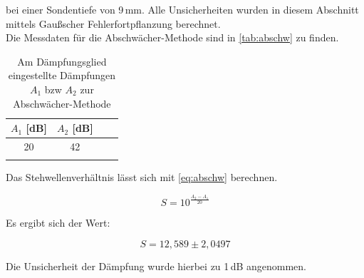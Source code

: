 bei einer Sondentiefe von 9\,mm. Alle Unsicherheiten wurden in diesem Abschnitt mittels Gaußscher Fehlerfortpflanzung berechnet.\\
Die Messdaten für die Abschwächer-Methode sind in \autoref{tab:abschw} zu finden.


\begin{table}
\centering
\caption{Am Dämpfungsglied eingestellte Dämpfungen $A_1$ bzw $A_2$ zur Abschwächer-Methode}
\begin{tabular}{c c c c}
\toprule
{$A_1$ [dB]} & {$A_2$ [dB]}\\
\midrule
20 & 42\\
\bottomrule
\label{tab:abschw}
\end{tabular}
\end{table}

Das Stehwellenverhältnis lässt sich mit \autoref{eq:abschw} berechnen.

\begin{equation}
S = 10^{\frac{A_2 - A_1}{20}}
\label{eq:abschw}
\end{equation}

Es ergibt sich der Wert:

\begin{equation}
S = 12,589 \pm 2,0497
\label{eq:abschw2}
\end{equation}

Die Unsicherheit der Dämpfung wurde hierbei zu 1\,dB angenommen.





































